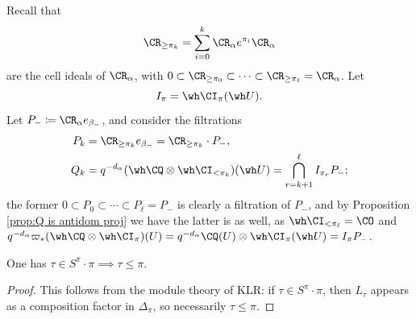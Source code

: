 \documentclass[11pt,reqno]{amsart}
\begin{document}
Recall that 
\[\CR_{\ge\pi_k}=\sum_{i=0}^k \CR_\alpha e^{\pi_i} \CR_\alpha\] 
are the cell ideals of $\CR_\alpha$, with $0\subset \CR_{\ge\pi_0}\subset\cdots\subset\CR_{\ge\pi_\ell}=\CR_\alpha$. Let
\[I_\pi=\wh\CI_\pi(\wh U).\] 
Let $P_-\coloneqq \CR_\alpha e_{\beta_-}$, and consider the filtrations
\begin{align*}
    P_k&=\CR_{\ge\pi_k} e_{\beta_-}=\CR_{\ge\pi_k}\cdot P_-,\\
    Q_k&=q^{-d_\alpha}(\wh \CQ\otimes\wh\CI_{<\pi_k})(\wh U)=\bigcap_{r=k+1}^\ell I_{\pi_r} P_-;
\end{align*}
the former $0\subset P_0\subset\cdots\subset P_\ell=P_-$ is clearly a filtration of $P_-$, and by Proposition \ref{prop:Q is antidom proj} we have the latter is as well, as $\wh\CI_{<\pi_\ell}=\CO$ and $q^{-d_\alpha}\varpi_*(\wh\CQ\otimes\wh\CI_\pi)(U)=q^{-d_\alpha}\CQ(U)\otimes \wh\CI_\pi(\wh U)=I_\pi P_-$. 
\begin{claim}\label{claim:M is Verma 1}
    One has $\tau\in S^\pi\cdot \pi\implies \tau\le\pi$. 
\end{claim}
\begin{proof}
    This follows from the module theory of KLR: if $\tau\in S^\pi\cdot\pi$, then $L_\tau$ appears as a composition factor in $\Delta_\pi$, so necessarily $\tau\le\pi$.
\end{proof}
\end{document}
